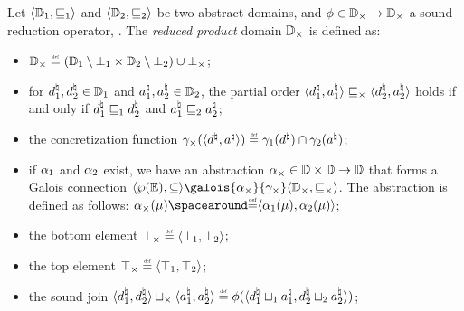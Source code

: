 \begin{definition}
Let $\langle \mathbb{D}_1, \sqsubseteq_1 \rangle$ and $\langle \mathbb{D}_2, \sqsubseteq_2 \rangle$ be two abstract domains, and $\phi\in\mathbb{D}_{\times}\to\mathbb{D}_{\times}$ a sound reduction operator, \cf{} .
The \emph{reduced product} domain $\mathbb{D}_{\times}$ is defined as:
\begin{itemize}
  \item $\productdomain \defeq (\abstractdomain_1 \setminus \abstractdomainbottom_1 \times \abstractdomain_2 \setminus \abstractdomainbottom_2) \setjoin \productdomainbottom$;
  \item for $d^\natural_1, d^\natural_2 \in \mathbb{D}_1$ and $a^\natural_1, a^\natural_2\in\mathbb{D}_2$, the partial order $\langle d^\natural_1, a^\natural_1 \rangle \sqsubseteq_{\times} \langle d^\natural_2, a^\natural_2 \rangle$ holds if and only if $d^\natural_1 \sqsubseteq_1 d^\natural_2$ and $a^\natural_1 \sqsubseteq_2 a^\natural_2$;
  \item the concretization function $\productdomainconcretization(\tuple{\defabstractvalue}{\defotherabstractvalue}) \defeq \abstractdomainconcretization_1(\defabstractvalue) \setmeet \abstractdomainconcretization_2(\defotherabstractvalue)$;
  \item if $\alpha_1$ and $\alpha_2$ exist, we have an abstraction $\alpha_{\times}\in\mathbb{D}\times\mathbb{D}\to\mathbb{D}$ that forms a Galois connection $\tuple{\setof\env}{\subseteq}\galois{\productdomainabstraction}{\productdomainconcretization}\tuple{\productdomain}{\productdomainsubseteq}$. The abstraction is defined as follows:
  $ \productdomainabstraction(\defenv) \DefeQ \tuple{\abstractdomainabstraction_1(\defenv)}{\abstractdomainabstraction_2(\defenv)} $;
  \item the bottom element $\productdomainbottom \defeq \tuple{\abstractdomainbottom_1}{\abstractdomainbottom_2}$;
  \item the top element $\productdomaintop \defeq \tuple{\abstractdomaintop_1}{\abstractdomaintop_2}$;
  \item the sound join $\tuple{\defabstractvalue_1}{\defabstractvalue_2} \productdomainjoin \tuple{\defotherabstractvalue_1}{\defotherabstractvalue_2} \defeq \productdomainreduce(\tuple{\defabstractvalue_1 \abstractdomainjoin_1 \defotherabstractvalue_1}{\defabstractvalue_2 \abstractdomainjoin_2 \defotherabstractvalue_2})$;

\end{itemize}
\end{definition}
